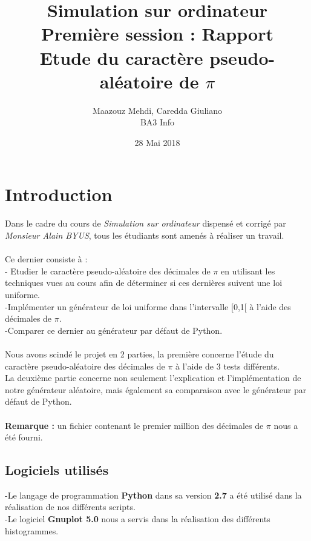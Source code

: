 \documentclass[french]{article}
\title{Simulation sur ordinateur \\ Première session : Rapport \\ Etude du caractère pseudo-aléatoire de $\pi$}
\author{Maazouz Mehdi, Caredda Giuliano \\ BA3 Info}
\date{28 Mai 2018}
\begin{document}
\maketitle
\newpage
\renewcommand{\contentsname}{Sommaire}
\tableofcontents
\newpage

\section{Introduction}
Dans le cadre du cours de \textit{Simulation sur ordinateur} dispensé et corrigé par \textit{Monsieur Alain BYUS}, tous les étudiants sont amenés à réaliser un travail.
\\
\\
Ce dernier consiste à : 
\\

     - Etudier le caractère pseudo-aléatoire des décimales de $\pi$ en utilisant les techniques vues au cours afin de déterminer si ces dernières suivent une loi uniforme.
     \\
     
     -Implémenter un générateur de loi uniforme dans l'intervalle [0,1[ à l'aide des décimales de $\pi$.
     \\
     
     -Comparer ce dernier au générateur par défaut de Python.
\\
\\
Nous avons scindé le projet en 2 parties, la première concerne l'étude du caractère pseudo-aléatoire des décimales
de $\pi$ à l'aide de 3 tests différents.
\\
La deuxième partie concerne non seulement l'explication et l'implémentation de notre générateur aléatoire, mais également sa comparaison avec le générateur par défaut de Python.
\\
\\
\textbf{Remarque :} un fichier contenant le premier million des décimales de $\pi$ nous a été fourni.

\subsection{Logiciels utilisés}
-Le langage de programmation \textbf{Python} dans sa version \textbf{2.7} a été utilisé dans la réalisation de nos différents scripts.
\\

-Le logiciel \textbf{Gnuplot 5.0} nous a servis dans la réalisation des différents histogrammes.
\\
\end{document}
